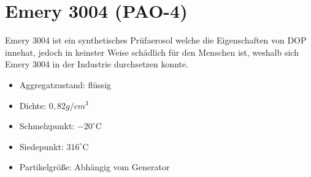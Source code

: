 \section{Emery 3004 (PAO-4)}
Emery 3004 ist ein synthetisches Pr\"{u}faerosol welche die Eigenschaften von DOP innehat, jedoch in keinster Weise sch\"{a}dlich f\"{u}r den Menschen ist, weshalb sich Emery 3004 in der Industrie durchsetzen konnte.
\begin{itemize}
\item Aggregatzustand: fl\"{u}ssig
\item Dichte: \(0,82 g/cm^3\)
\item Schmelzpunkt: \(-20^\circ\text{C}\)
\item Siedepunkt: \(316^\circ\text{C}\)
\item Partikelgr\"{o}{\ss}e: Abh\"{a}ngig vom Generator
\end{itemize}